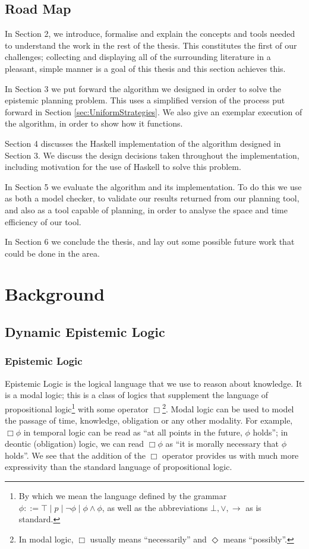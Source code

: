 \documentclass[10pt, a4paper]{report}
\begin{document}
\section{Road Map}

In Section 2, we introduce, formalise and explain the concepts and tools needed
to understand the work in the rest of the thesis. This constitutes the first of
our challenges; collecting and displaying all of the surrounding literature in a
pleasant, simple manner is a goal of this thesis and this section achieves this.

In Section 3 we put forward the algorithm we designed in order to solve the
epistemic planning problem. This uses a simplified version of the process put
forward in Section \ref{sec:UniformStrategies}. We also give an exemplar execution of
the algorithm, in order to show how it functions.

Section 4 discusses the Haskell implementation of the algorithm designed in
Section 3. We discuss the design decisions taken throughout the implementation,
including motivation for the use of Haskell to solve this problem.

In Section 5 we evaluate the algorithm and its implementation. To do this we
use \cite{GithubGossip} as both a model checker, to validate our results
returned from our planning tool, and also as a tool capable of planning, in
order to analyse the space and time efficiency of our tool. 

In Section 6 we conclude the thesis, and lay out some possible future work that
could be done in the area. 

\newpage

\chapter{Background}

\section{Dynamic Epistemic Logic}
\label{sec:DEL}

\subsection{Epistemic Logic}

Epistemic Logic is the logical language that we use to reason about knowledge.
It is a modal logic; this is a class of logics that supplement the language of
propositional logic\footnote{By which we mean the language defined by the
  grammar $\phi ::= \top \mid p \mid \neg \phi \mid \phi \land \phi$, as well as
  the abbreviations $\bot, \lor, \rightarrow$ as is standard.} with some
operator $\Box$\footnote{In modal logic, $\Box$ usually means ``necessarily''
  and $\Diamond$ means ``possibly''.}. Modal logic can be used to model the
passage of time, knowledge, obligation or any other modality. For example, $\Box
\phi$ in temporal logic can be read as ``at all points in the future, $\phi$
holds''; in deontic (obligation) logic, we can read $\Box \phi$ as ``it is
morally necessary that $\phi$ holds''. We see that the addition of the $\Box$
operator provides us with much more expressivity than the standard language of
propositional logic.
\end{document}
